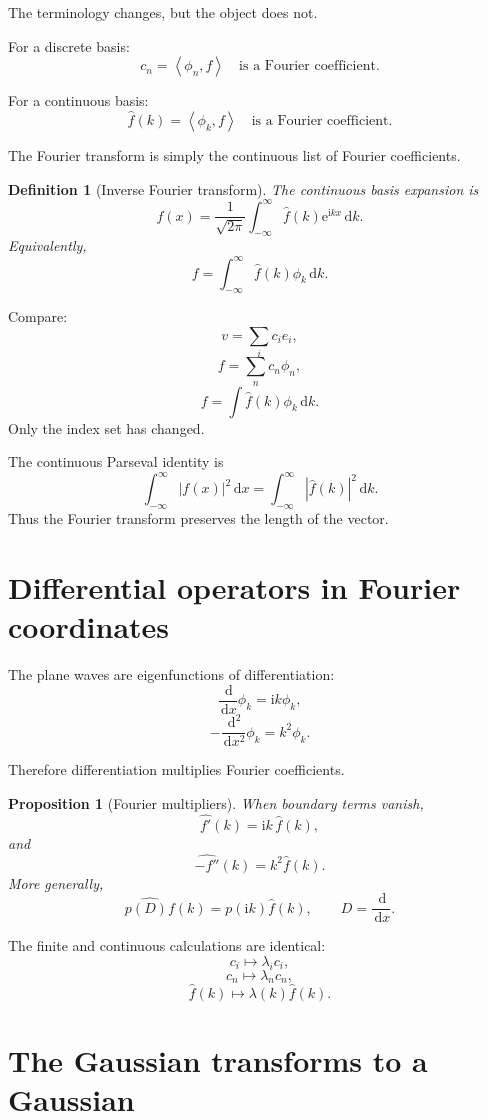 \documentclass[11pt,a5paper,oneside,openany]{scrreprt}
\theoremstyle{notes}
\newtheorem{proposition}[theorem]{Proposition}
\theoremstyle{definitions}
\newtheorem{definition}[theorem]{Definition}
\newcommand{\ip}[2]{\left\langle #1,#2\right\rangle}
\newcommand{\dd}{\,\mathrm{d}}
\newcommand{\e}{\mathrm{e}}
\begin{document}
\begin{bridge}
The terminology changes, but the object does not.

For a discrete basis:
\[
 c_n=\ip{\phi_n}{f}
 \quad\text{is a Fourier coefficient}.
\]

For a continuous basis:
\[
 \widehat f(k)=\ip{\phi_k}{f}
 \quad\text{is a Fourier coefficient}.
\]

The Fourier transform is simply the continuous list of Fourier
coefficients.
\end{bridge}

\begin{definition}[Inverse Fourier transform]
The continuous basis expansion is
\[
 \boxed{
 f(x)=\frac1{\sqrt{2\pi}}
 \int_{-\infty}^{\infty}
 \widehat f(k)\e^{\mathrm i kx}\dd k.}
\]
Equivalently,
\[
 f=\int_{-\infty}^{\infty}\widehat f(k)\phi_k\dd k.
\]
\end{definition}

Compare:
\[
 v=\sum_i c_i e_i,
\]
\[
 f=\sum_n c_n\phi_n,
\]
\[
 f=\int\widehat f(k)\phi_k\dd k.
\]
Only the index set has changed.

The continuous Parseval identity is
\[
 \boxed{
 \int_{-\infty}^{\infty}|f(x)|^2\dd x
 =\int_{-\infty}^{\infty}|\widehat f(k)|^2\dd k.}
\]
Thus the Fourier transform preserves the length of the vector.

\section{Differential operators in Fourier coordinates}

The plane waves are eigenfunctions of differentiation:
\[
 \frac{\dd}{\dd x}\phi_k=\mathrm i k\phi_k,
\]
\[
 -\frac{\dd^2}{\dd x^2}\phi_k=k^2\phi_k.
\]

Therefore differentiation multiplies Fourier coefficients.

\begin{proposition}[Fourier multipliers]
When boundary terms vanish,
\[
 \boxed{\widehat{f'}(k)=\mathrm i k\,\widehat f(k),}
\]
and
\[
 \boxed{\widehat{-f''}(k)=k^2\widehat f(k).}
\]
More generally,
\[
 \widehat{p(D)f}(k)
 =p(\mathrm i k)\widehat f(k),
 \qquad
 D=\frac{\dd}{\dd x}.
\]
\end{proposition}

The finite and continuous calculations are identical:
\[
 c_i\longmapsto\lambda_i c_i,
\]
\[
 c_n\longmapsto\lambda_n c_n,
\]
\[
 \widehat f(k)\longmapsto\lambda(k)\widehat f(k).
\]

\section{The Gaussian transforms to a Gaussian}
\end{document}

